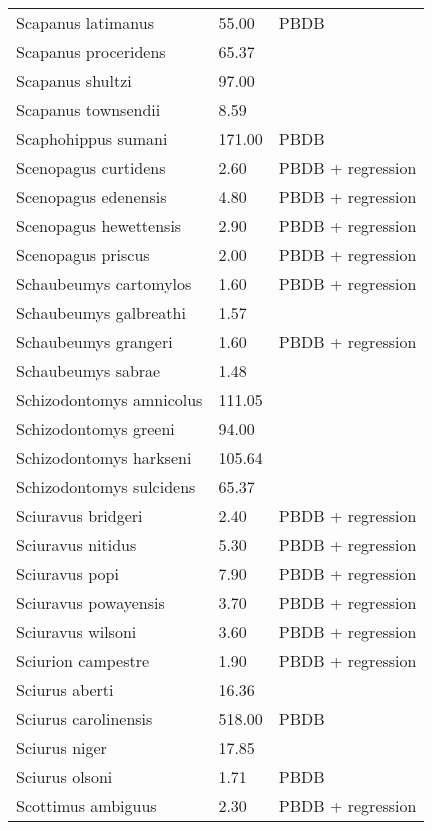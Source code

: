\begin{longtable}{p{} p{} p{}}
    Scapanus latimanus & 55.00 & PBDB \\ 
    Scapanus proceridens & 65.37 & \cite{Tomiya2013} \\ 
    Scapanus shultzi & 97.00 & \cite{McKenna2011} \\ 
    Scapanus townsendii & 8.59 & \cite{Smith2004} \\ 
    Scaphohippus sumani & 171.00 & PBDB \\ 
    Scenopagus curtidens & 2.60 & PBDB + regression \\ 
    Scenopagus edenensis & 4.80 & PBDB + regression \\ 
    Scenopagus hewettensis & 2.90 & PBDB + regression \\ 
    Scenopagus priscus & 2.00 & PBDB + regression \\ 
    Schaubeumys cartomylos & 1.60 & PBDB + regression \\ 
    Schaubeumys galbreathi & 1.57 & \cite{Loomis1911} \\ 
    Schaubeumys grangeri & 1.60 & PBDB + regression \\ 
    Schaubeumys sabrae & 1.48 & \cite{Matthew1901} \\ 
    Schizodontomys amnicolus & 111.05 & \cite{Tomiya2013} \\ 
    Schizodontomys greeni & 94.00 & \cite{McKenna2011} \\ 
    Schizodontomys harkseni & 105.64 & \cite{Tomiya2013} \\ 
    Schizodontomys sulcidens & 65.37 & \cite{Tomiya2013} \\ 
    Sciuravus bridgeri & 2.40 & PBDB + regression \\ 
    Sciuravus nitidus & 5.30 & PBDB + regression \\ 
    Sciuravus popi & 7.90 & PBDB + regression \\ 
    Sciuravus powayensis & 3.70 & PBDB + regression \\ 
    Sciuravus wilsoni & 3.60 & PBDB + regression \\ 
    Sciurion campestre & 1.90 & PBDB + regression \\ 
    Sciurus aberti & 16.36 & \cite{Smith2004} \\ 
    Sciurus carolinensis & 518.00 & PBDB \\ 
    Sciurus niger & 17.85 & \cite{Smith2004} \\ 
    Sciurus olsoni & 1.71 & PBDB \\ 
    Scottimus ambiguus & 2.30 & PBDB + regression \\ 

\end{longtable}
